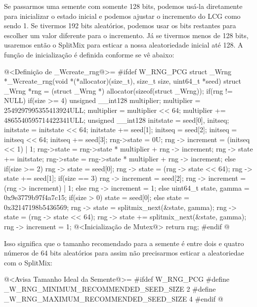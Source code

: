 Se passarmos uma semente com somente 128 bits, podemos usá-la
diretamente para inicializar o estado inicial e podemos ajustar o
incremento do LCG como sendo 1. Se tivermos 192 bits aleatórios,
podemos usar os bits restantes para escolher um valor diferente para o
incremento. Já se tivermos menos de 128 bits, usaremos então o
SplitMix para esticar a nossa aleatoriedade inicial até 128. A função
de inicialização é definida conforme se vê abaixo:

\iniciocodigo
@<Definição de \_Wcreate\_rng@>=
#ifdef W_RNG_PCG
struct _Wrng *_Wcreate_rng(void *(*allocator)(size_t), size_t size,
                           uint64_t *seed){
  struct _Wrng *rng = (struct _Wrng *) allocator(sizeof(struct _Wrng));
  if(rng != NULL){
    if(size >= 4){
      unsigned __int128 multiplier;
      multiplier = 2549297995355413924ULL;
      multiplier = multiplier << 64;
      multiplier += 4865540595714422341ULL;
      unsigned __int128 initstate = seed[0], initseq;
      initstate = initstate << 64;
      initstate += seed[1];
      initseq = seed[2];
      initseq = initseq << 64;
      initseq += seed[3];
      rng->state = 0U;
      rng -> increment = (initseq << 1) | 1;
      rng->state = rng->state * multiplier + rng -> increment;
      rng -> state += initstate;
      rng->state = rng->state * multiplier + rng -> increment;
    }
    else if(size >= 2){
      rng -> state = seed[0];
      rng -> state = (rng -> state << 64);
      rng -> state += seed[1];
      if(size == 3){
        rng -> increment = seed[2];
        rng -> increment = (rng -> increment) | 1;
      }
      else
        rng -> increment = 1;
    }
    else{
      uint64_t state, gamma = 0x9e3779b97f4a7c15;
      if(size > 0)
        state = seed[0];
      else
        state = 0x32147198b5436569;
      rng -> state = splitmix_next(&state, gamma);
      rng -> state = (rng -> state << 64);
      rng -> state += splitmix_next(&state, gamma);
      rng -> increment = 1;
    }
    @<Inicialização de Mutex@>
  }
  return rng;
}
#endif
@
\fimcodigo

Isso significa que o tamanho recomendado para a semente é entre dois e
quatro números de 64 bits aleatórios para assim não precisarmos
esticar a aleatoriedae com o SplitMix:

\iniciocodigo
@<Avisa Tamanho Ideal da Semente@>=
#ifdef W_RNG_PCG
#define _W_RNG_MINIMUM_RECOMMENDED_SEED_SIZE  2
#define _W_RNG_MAXIMUM_RECOMMENDED_SEED_SIZE  4
#endif
@
\fimcodigo


